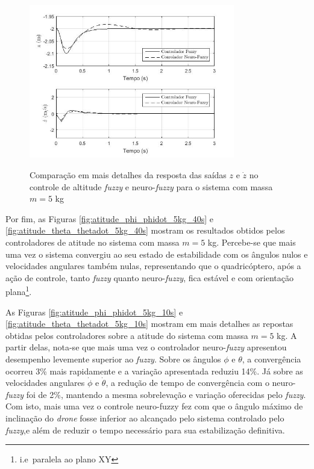 \begin{figure}[!htb]
    \centering
    \caption{Comparação em mais detalhes da resposta das saídas $z$ e $\dot{z}$ no controle de altitude \textit{fuzzy} e neuro-\textit{fuzzy} para o sistema com massa $m=5$ kg}
    \includegraphics[width=0.8\textwidth]{./04-figuras/figuras_pos_banca/6-altitude5kg/graph_z_zdot_5kg_details}
    \label{fig:altitude_z_zdot_5kg_closer}
\end{figure}



Por fim, as Figuras \ref{fig:atitude_phi_phidot_5kg_40s} e \ref{fig:atitude_theta_thetadot_5kg_40s} mostram os resultados obtidos pelos controladores de atitude no sistema com massa $m=5$ kg. Percebe-se que mais uma vez o sistema convergiu ao seu estado de estabilidade com os ângulos nulos e velocidades angulares também nulas, representando que o quadricóptero, após a ação de controle, tanto \textit{fuzzy} quanto neuro-\textit{fuzzy}, fica estável e com orientação plana\footnote{i.e\ paralela ao plano XY}.

As Figuras \ref{fig:atitude_phi_phidot_5kg_10s} e \ref{fig:atitude_theta_thetadot_5kg_10s} mostram em mais detalhes as repostas obtidas pelos controladores sobre a atitude do sistema com massa $m=5$ kg. A partir delas, nota-se que mais uma vez o controlador neuro-\textit{fuzzy} apresentou desempenho levemente superior ao \textit{fuzzy}. Sobre os ângulos $\phi$ e $\theta$, a convergência ocorreu 3\% mais rapidamente e a variação apresentada reduziu 14\%. Já sobre as velocidades angulares $\dot{\phi}$ e $\dot{\theta}$, a redução de tempo de convergência com o neuro-\textit{fuzzy} foi de 2\%, mantendo a mesma sobrelevação e variação oferecidas pelo \textit{fuzzy}. Com isto, mais uma vez o controle neuro-fuzzy fez com que o ângulo máximo de inclinação do \textit{drone} fosse inferior ao alcançado pelo sistema controlado pelo \textit{fuzzy},e além de reduzir o tempo necessário para sua estabilização definitiva.

